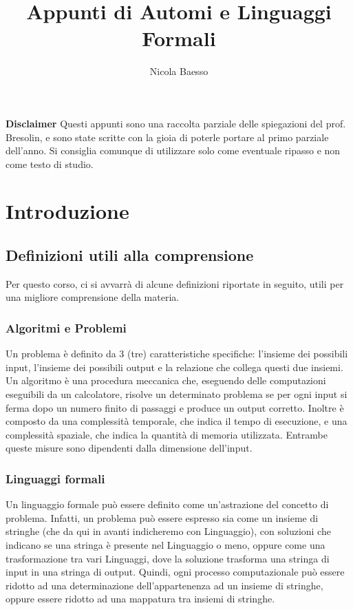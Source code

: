 \documentclass[]{article}
\title{Appunti di Automi e Linguaggi Formali}
\author{Nicola Baesso}
\begin{document}
\maketitle

\newpage
\tableofcontents
\newpage

\textbf{Disclaimer}
\newline
\newline
Questi appunti sono una raccolta parziale delle spiegazioni del prof. Bresolin, e sono state scritte con la gioia di poterle portare al primo parziale dell'anno. Si consiglia comunque di utilizzare solo come eventuale ripasso e non come testo di studio.
\newpage
\section{Introduzione}
\subsection{Definizioni utili alla comprensione}
Per questo corso, ci si avvarrà di alcune definizioni riportate in seguito, utili per una migliore comprensione della materia.
\subsubsection{Algoritmi e Problemi}
Un problema è definito da 3 (tre) caratteristiche specifiche: l'insieme dei possibili input, l'insieme dei possibili output e la relazione che collega questi due insiemi.
\newline
Un algoritmo è una procedura meccanica che, eseguendo delle computazioni eseguibili da un calcolatore, risolve un determinato problema se per ogni input si ferma dopo un numero finito di passaggi e produce un output corretto.
\newline Inoltre è composto da una complessità temporale, che indica il tempo di esecuzione, e una complessità spaziale, che indica la quantità di memoria utilizzata. Entrambe queste misure sono dipendenti dalla dimensione dell'input.
\subsubsection{Linguaggi formali}
Un linguaggio formale può essere definito come un'astrazione del concetto di problema. 
\newline
Infatti, un problema può essere espresso sia come un insieme di stringhe (che da qui in avanti indicheremo con Linguaggio), con soluzioni che indicano se una stringa è presente nel Linguaggio o meno, oppure come una trasformazione tra vari Linguaggi, dove la soluzione trasforma una stringa di input in una stringa di output.
\newline
Quindi, ogni processo computazionale può essere ridotto ad una determinazione dell'appartenenza ad un insieme di stringhe, oppure essere ridotto ad una mappatura tra insiemi di stringhe.
\end{document}
